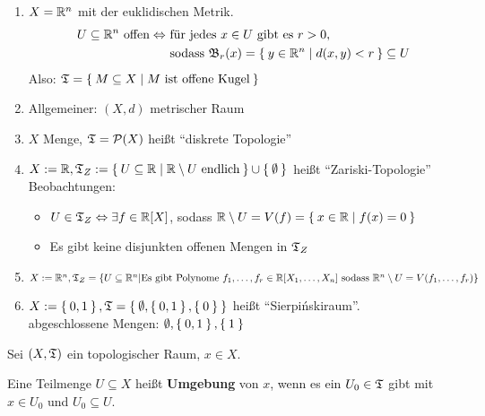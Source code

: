 \begin{beispiel}
    \begin{enumerate}[label=\arabic*)]
        \item $X = \mathbb{R}^n$ mit der euklidischen Metrik. 
              \begin{align*}
                U \subseteq \mathbb{R}^n \text{ offen} \Leftrightarrow &\text{ für jedes } x \in U \text{ gibt es } r > 0,\\
                                                      &\text{ sodass } \mathfrak{B}_r(x) = \Set{y \in \ensuremath{\mathbb{R}}^n | d(x,y) < r} \subseteq U
              \end{align*}
              Also: $\mathfrak{T} = \Set{M \subseteq X | M \text{ ist offene Kugel}}$
        \item Allgemeiner: $(X, d)$ metrischer Raum
        \item $X$ Menge, $\mathfrak{T} = \mathcal{P}(X)$ heißt \enquote{diskrete Topologie} 
        \item $X :=\mathbb{R}, \mathfrak{T}_Z := \Set{U \subseteq \ensuremath{\mathbb{R}}| \ensuremath{\mathbb{R}}\setminus U \text{ endlich}} \cup \Set{\emptyset}$ heißt \enquote{Zariski-Topologie} \\
              Beobachtungen: 
            \begin{itemize}
                \item $U \in \mathfrak{T}_Z \Leftrightarrow \exists f \in \mathbb{R}[X]$, sodass $\mathbb{R} \setminus U = V(f) = \Set{x \in \ensuremath{\mathbb{R}}| f(x) = 0}$
                \item Es gibt keine disjunkten offenen Mengen in $\mathfrak{T}_Z$
            \end{itemize}
        \item $X := \mathbb{R}^n, \mathfrak{T}_Z = \{U \subseteq \mathbb{R}^n | \text{Es gibt Polynome } f_1, \dots, f_r \in \mathbb{R}[X_1, \dots, X_n] \text{ sodass }\\\mathbb{R}^n \setminus U = V(f_1, \dots, f_r)\}$
        \item $X := \Set{0,1}, \mathfrak{T} = \Set{\emptyset, \Set{0,1}, \Set{0}}$ heißt \enquote{Sierpińskiraum}.\\
              abgeschlossene Mengen: $\emptyset, \Set{0,1}, \Set{1}$
    \end{enumerate}
\end{beispiel}

\begin{definition} 
    Sei $(X, \mathfrak{T})$ ein topologischer Raum, $x \in X$.

    Eine Teilmenge $U \subseteq X$ heißt \textbf{Umgebung} von $x$,
    wenn es ein $U_0 \in \mathfrak{T}$ gibt mit $x \in U_0$ und $U_0 \subseteq U$.
\end{definition}

